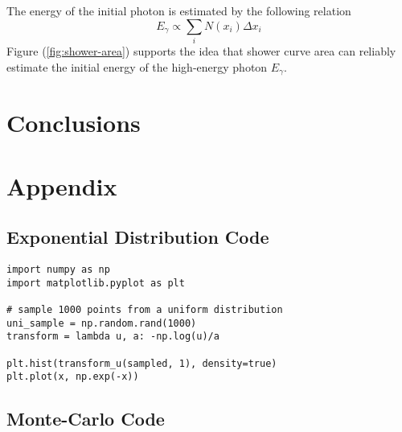 \documentclass{article}
\begin{document}
The energy of the initial photon is estimated by the following relation
\begin{equation}
    E_\gamma \propto \sum_{i} N(x_i) \Delta x_i
\end{equation}
Figure (\ref{fig:shower-area}) supports the idea that shower curve area can reliably estimate the initial energy of the high-energy photon \( E_\gamma \).
\section{Conclusions} %
\label{sec:Conclusions}

\section{Appendix} %
\label{sec:Appendix}

\newpage
\subsection{Exponential Distribution Code} %
\label{sub:Exponential Distribution Code}
\begin{verbatim}
import numpy as np
import matplotlib.pyplot as plt

# sample 1000 points from a uniform distribution
uni_sample = np.random.rand(1000)
transform = lambda u, a: -np.log(u)/a

plt.hist(transform_u(sampled, 1), density=true)
plt.plot(x, np.exp(-x))
\end{verbatim}

\subsection{Monte-Carlo Code} %
\label{sub:Monte-Carlo Code}



\end{document}
